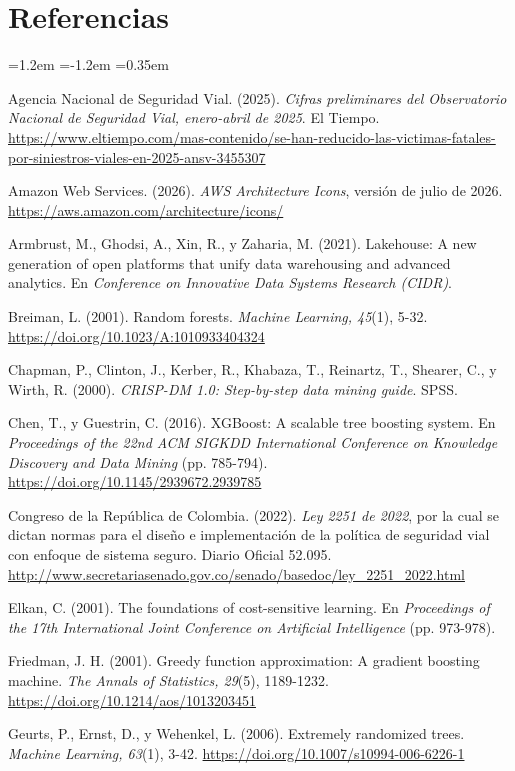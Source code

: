 \documentclass[11pt,a4paper]{article}
\begin{document}
\section*{Referencias}
\begin{list}{}{\leftmargin=1.2em \itemindent=-1.2em \itemsep=0.35em \parsep=0pt}
\small
\item Agencia Nacional de Seguridad Vial. (2025). \textit{Cifras preliminares del Observatorio Nacional de Seguridad Vial, enero-abril de 2025}. El Tiempo. \url{https://www.eltiempo.com/mas-contenido/se-han-reducido-las-victimas-fatales-por-siniestros-viales-en-2025-ansv-3455307}
\item Amazon Web Services. (2026). \textit{AWS Architecture Icons}, versión de julio de 2026. \url{https://aws.amazon.com/architecture/icons/}
\item Armbrust, M., Ghodsi, A., Xin, R., y Zaharia, M. (2021). Lakehouse: A new generation of open platforms that unify data warehousing and advanced analytics. En \textit{Conference on Innovative Data Systems Research (CIDR)}.
\item Breiman, L. (2001). Random forests. \textit{Machine Learning, 45}(1), 5-32. \url{https://doi.org/10.1023/A:1010933404324}
\item Chapman, P., Clinton, J., Kerber, R., Khabaza, T., Reinartz, T., Shearer, C., y Wirth, R. (2000). \textit{CRISP-DM 1.0: Step-by-step data mining guide}. SPSS.
\item Chen, T., y Guestrin, C. (2016). XGBoost: A scalable tree boosting system. En \textit{Proceedings of the 22nd ACM SIGKDD International Conference on Knowledge Discovery and Data Mining} (pp. 785-794). \url{https://doi.org/10.1145/2939672.2939785}
\item Congreso de la República de Colombia. (2022). \textit{Ley 2251 de 2022}, por la cual se dictan normas para el diseño e implementación de la política de seguridad vial con enfoque de sistema seguro. Diario Oficial 52.095. \url{http://www.secretariasenado.gov.co/senado/basedoc/ley_2251_2022.html}
\item Elkan, C. (2001). The foundations of cost-sensitive learning. En \textit{Proceedings of the 17th International Joint Conference on Artificial Intelligence} (pp. 973-978).
\item Friedman, J. H. (2001). Greedy function approximation: A gradient boosting machine. \textit{The Annals of Statistics, 29}(5), 1189-1232. \url{https://doi.org/10.1214/aos/1013203451}
\item Geurts, P., Ernst, D., y Wehenkel, L. (2006). Extremely randomized trees. \textit{Machine Learning, 63}(1), 3-42. \url{https://doi.org/10.1007/s10994-006-6226-1}

\end{list}
\end{document}
